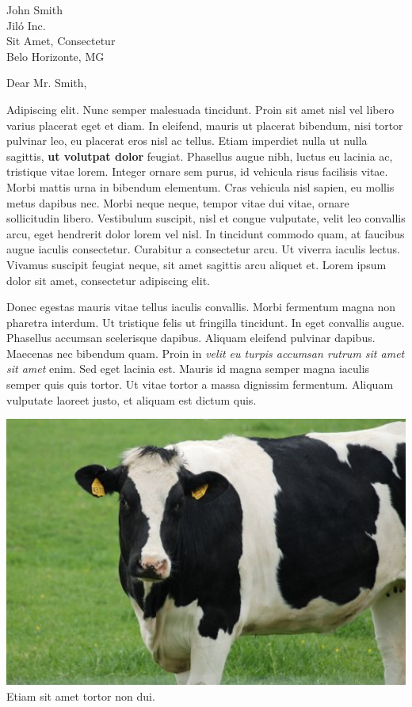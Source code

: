 \documentclass[a4paper,obeyspaces]{letter}
\begin{document}
\begin{letter}{John Smith\\ Jiló Inc.\\ Sit Amet, Consectetur \\ Belo Horizonte, MG}


%
\opening{Dear Mr. Smith,}

Adipiscing elit. Nunc semper malesuada tincidunt. Proin sit amet nisl vel 
libero varius placerat eget et diam. In eleifend, mauris ut placerat bibendum, 
nisi tortor pulvinar leo, eu placerat eros nisl ac tellus. Etiam imperdiet 
nulla ut nulla sagittis, \textbf{ut volutpat dolor} feugiat. Phasellus augue 
nibh, luctus eu lacinia ac, tristique vitae lorem. Integer ornare sem purus, 
id vehicula risus facilisis vitae. Morbi mattis urna in bibendum elementum. 
Cras vehicula nisl sapien, eu mollis metus dapibus nec. Morbi neque neque, 
tempor vitae dui vitae, ornare sollicitudin libero. Vestibulum suscipit, nisl 
et congue vulputate, velit leo convallis arcu, eget hendrerit dolor lorem vel 
nisl. In tincidunt commodo quam, at faucibus augue iaculis consectetur. 
Curabitur a consectetur arcu. Ut viverra iaculis lectus. Vivamus suscipit 
feugiat neque, sit amet sagittis arcu aliquet et. Lorem ipsum dolor sit amet, 
consectetur adipiscing elit.

Donec egestas mauris vitae tellus iaculis convallis. Morbi fermentum magna non 
pharetra interdum. Ut tristique felis ut fringilla tincidunt. In eget convallis 
augue. Phasellus accumsan scelerisque dapibus. Aliquam eleifend pulvinar 
dapibus. Maecenas nec bibendum quam. Proin in \textit{velit eu turpis accumsan 
rutrum sit amet sit amet} enim. Sed eget lacinia est. Mauris id magna semper 
magna iaculis semper quis quis tortor. Ut vitae tortor a massa dignissim 
fermentum. Aliquam vulputate laoreet justo, et aliquam est dictum quis.

\begin{center}
\includegraphics[width=1\textwidth]{../img/cow-480x320.jpg}\\
{Etiam sit amet tortor non dui.}
\end{center}


\end{letter}
\end{document}
